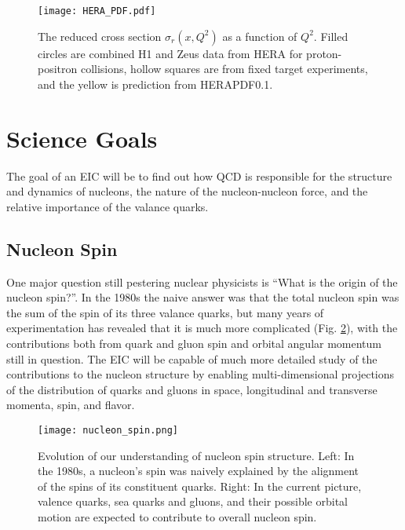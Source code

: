 \begin{figure}[!htb]
	\centering
	\texttt{[image: HERA\_PDF.pdf]}
	\caption{The reduced cross section $\sigma_{r}(x,Q^2)$ as a function of $Q^2$. Filled circles are combined H1 and Zeus data from HERA for proton-positron collisions, hollow squares are from fixed target experiments, and the yellow is prediction from HERAPDF0.1. \cite{HERAStructureFunction}}
	\label{fig:HERA_pdf}
\end{figure}

\section{Science Goals}
The goal of an EIC will be to find out how QCD is responsible for the structure and dynamics of nucleons, the nature of the nucleon-nucleon force, and the relative importance of the valance quarks.

\subsection{Nucleon Spin}
One major question still pestering nuclear physicists is ``What is the origin of the nucleon spin?''. In the 1980s the naive answer was that the total nucleon spin was the sum of the spin of its three valance quarks, but many years of experimentation has revealed that it is much more complicated (Fig. \ref{fig:nucleon_spin}), with the contributions both from quark and gluon spin and orbital angular momentum still in question. The EIC will be capable of much more detailed study of the contributions to the nucleon structure by enabling multi-dimensional projections of the distribution of quarks and gluons in space, longitudinal and transverse momenta, spin, and flavor.

\begin{figure}[!htb]
	\centering
	\texttt{[image: nucleon\_spin.png]}
	\caption{Evolution of our understanding of nucleon spin structure. Left: In the 1980s, a nucleon’s spin was naively explained by the alignment of the spins of its constituent quarks. Right: In the current picture, valence quarks, sea quarks and gluons, and their possible orbital motion are expected to contribute to overall nucleon spin. \cite{EICWhitePaper}}
	\label{fig:nucleon_spin}
\end{figure}

